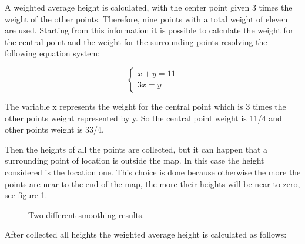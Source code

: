 \documentclass[12pt]{article}
\begin{document}
    \noindent
    A weighted average height is calculated, with the center point given 3 times the weight of the other points. Therefore, nine points with a total weight of eleven are used.
    Starting from this information it is possible to calculate the weight for the central point and the weight for the surrounding points resolving the following equation system:

    \begin{equation}
        \begin{cases}
            x + y = 11
            \\ 3x = y
        \end{cases}
    \end{equation}

    \noindent
    The variable x represents the weight for the central point which is 3 times the other points weight represented by y. So the central point weight is 11/4 and other points weight is 33/4.

    Then the heights of all the points are collected, but it can happen that a surrounding point of location is outside the map. In this case the height considered  is the location one. 
    This choice is done because otherwise the more the points are near to the end of the map, the more their heights will be near to zero, see figure \ref{fig:SmotthingCamparison}.
    
    \begin{figure}
        \centering     %
        \caption{Two different smoothing results.}
        \label{fig:SmotthingCamparison}
    \end{figure}
        
    
    After collected all heights the weighted average height is calculated as follows:
\end{document}
